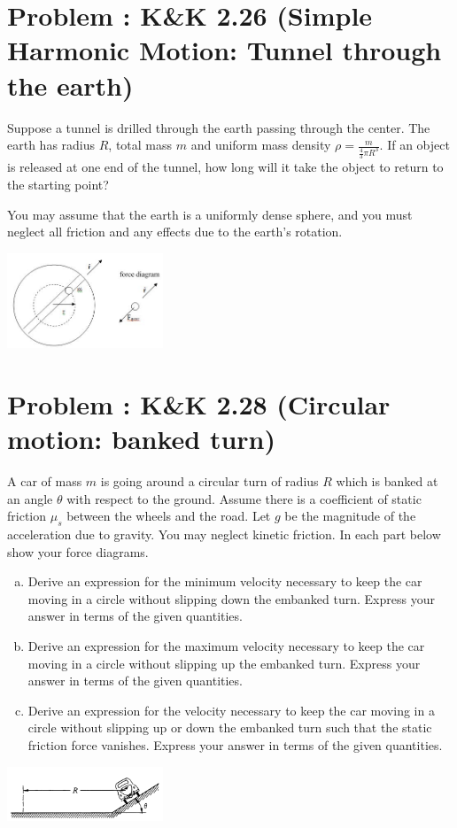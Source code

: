 \documentclass[problems]{esg8012pset}
\begin{document}
\section{Problem \thesection: K\&K 2.26 (Simple Harmonic Motion: Tunnel through the earth)}
  Suppose a tunnel is drilled through the earth passing through the center. The earth has radius $R$, total mass $m$ and uniform mass density $\rho = \frac{m}{\frac{4}{3}\pi R^3}$.  If an object is released at one end of the tunnel, how long will it take the object to return to the starting point?

  You may assume that the earth is a uniformly dense sphere, and you must neglect all friction and any effects due to the earth's rotation.
  \begin{center}\includegraphics[width=0.35\textwidth]{ps03_2}\end{center}
\section{Problem \thesection: K\&K 2.28 (Circular motion: banked turn)}
  A car of mass $m$ is going around a circular turn of radius $R$ which is banked at an angle $\theta$ with respect to the ground. Assume there is a coefficient of static friction $\mu_s$ between the wheels and the road. Let $g$ be the magnitude of the acceleration due to gravity. You may neglect kinetic friction. In each part below show your force diagrams.
  \begin{enumerate}[a)]
    \item Derive an expression for the minimum velocity necessary to keep the car moving in a circle without slipping down the embanked turn. Express your answer in terms of the given quantities.
    \item Derive an expression for the maximum velocity necessary to keep the car moving in a circle without slipping up the embanked turn. Express your answer in terms of the given quantities.
    \item Derive an expression for the velocity necessary to keep the car moving in a circle without slipping up or down the embanked turn such that the static friction force vanishes. Express your answer in terms of the given quantities.
  \end{enumerate}
  \begin{center}\includegraphics[width=0.35\textwidth]{ps03_3}\end{center}
\end{document}
